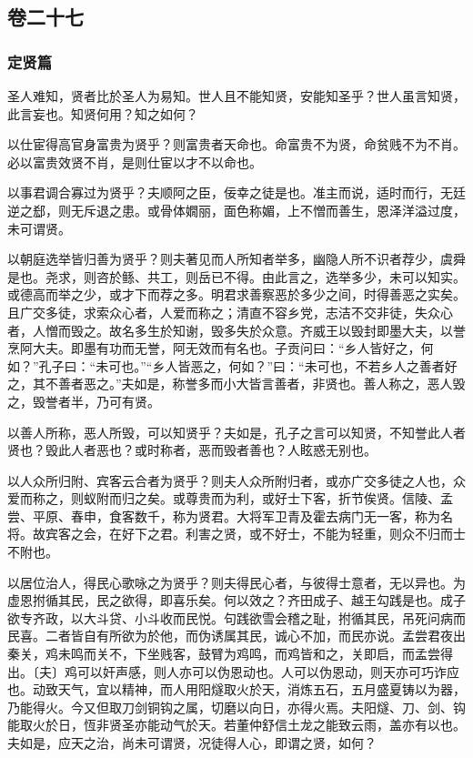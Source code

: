 \documentclass[]{article}
\begin{document}
\hypertarget{header-n883}{%
\subsection{卷二十七}\label{header-n883}}

\hypertarget{header-n884}{%
\subsubsection{定贤篇}\label{header-n884}}

圣人难知，贤者比於圣人为易知。世人且不能知贤，安能知圣乎？世人虽言知贤，此言妄也。知贤何用？知之如何？

以仕宦得高官身富贵为贤乎？则富贵者天命也。命富贵不为贤，命贫贱不为不肖。必以富贵效贤不肖，是则仕宦以才不以命也。

以事君调合寡过为贤乎？夫顺阿之臣，佞幸之徒是也。准主而说，适时而行，无廷逆之郄，则无斥退之患。或骨体嫺丽，面色称媚，上不憎而善生，恩泽洋溢过度，未可谓贤。

以朝庭选举皆归善为贤乎？则夫著见而人所知者举多，幽隐人所不识者荐少，虞舜是也。尧求，则咨於鲧、共工，则岳已不得。由此言之，选举多少，未可以知实。或德高而举之少，或才下而荐之多。明君求善察恶於多少之间，时得善恶之实矣。且广交多徒，求索众心者，人爱而称之；清直不容乡党，志洁不交非徒，失众心者，人憎而毁之。故名多生於知谢，毁多失於众意。齐威王以毁封即墨大夫，以誉烹阿大夫。即墨有功而无誉，阿无效而有名也。子贡问曰：``乡人皆好之，何如？''孔子曰：``未可也。''``乡人皆恶之，何如？''曰：``未可也，不若乡人之善者好之，其不善者恶之。''夫如是，称誉多而小大皆言善者，非贤也。善人称之，恶人毁之，毁誉者半，乃可有贤。

以善人所称，恶人所毁，可以知贤乎？夫如是，孔子之言可以知贤，不知誉此人者贤也？毁此人者恶也？或时称者，恶而毁者善也？人眩惑无别也。

以人众所归附、宾客云合者为贤乎？则夫人众所附归者，或亦广交多徒之人也，众爱而称之，则蚁附而归之矣。或尊贵而为利，或好士下客，折节俟贤。信陵、孟尝、平原、春申，食客数千，称为贤君。大将军卫青及霍去病门无一客，称为名将。故宾客之会，在好下之君。利害之贤，或不好士，不能为轻重，则众不归而士不附也。

以居位治人，得民心歌咏之为贤乎？则夫得民心者，与彼得士意者，无以异也。为虚恩拊循其民，民之欲得，即喜乐矣。何以效之？齐田成子、越王勾践是也。成子欲专齐政，以大斗贷、小斗收而民悦。句践欲雪会稽之耻，拊循其民，吊死问病而民喜。二者皆自有所欲为於他，而伪诱属其民，诚心不加，而民亦说。孟尝君夜出秦关，鸡未鸣而关不，下坐贱客，鼓臂为鸡鸣，而鸡皆和之，关即启，而孟尝得出。〔夫〕鸡可以奸声感，则人亦可以伪恩动也。人可以伪恩动，则天亦可巧诈应也。动致天气，宜以精神，而人用阳燧取火於天，消炼五石，五月盛夏铸以为器，乃能得火。今又但取刀剑铜钩之属，切磨以向日，亦得火焉。夫阳燧、刀、剑、钩能取火於日，恆非贤圣亦能动气於天。若董仲舒信土龙之能致云雨，盖亦有以也。夫如是，应天之治，尚未可谓贤，况徒得人心，即谓之贤，如何？
\end{document}
